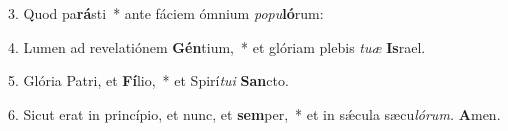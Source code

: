 \item 3. Quod pa\textbf{rá}sti~* ante fáciem ómnium \textit{popu}\textbf{ló}rum:
\item 4. Lumen ad revelatiónem \textbf{Gén}tium,~* et glóriam plebis \textit{tuæ} \textbf{Is}rael.
\item 5. Glória Patri, et \textbf{Fí}lio,~* et Spirí\hspace{0.03em}\textit{tui} \textbf{San}cto.
\item 6. Sicut erat in princípio, et nunc, et \textbf{sem}per,~* et in sǽcula sæcu\hspace{0.03em}\textit{lórum.} \textbf{A}men.
